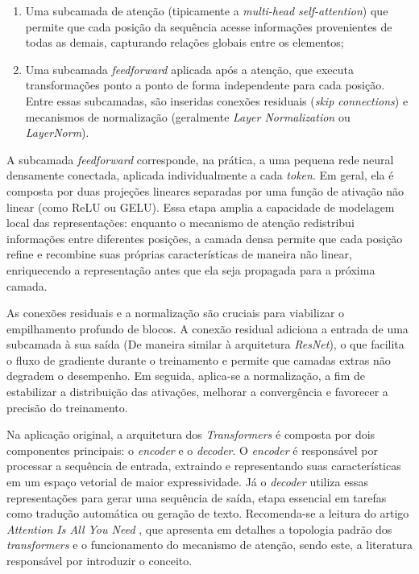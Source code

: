 \begin{enumerate}
    \item Uma subcamada de atenção (tipicamente a \textit{multi-head self-attention}) que permite que cada posição da sequência acesse informações provenientes de todas as demais, capturando relações globais entre os elementos;
    \item Uma subcamada \textit{feedforward} aplicada após a atenção, que executa transformações ponto a ponto de forma independente para cada posição. Entre essas subcamadas, são inseridas conexões residuais (\textit{skip connections}) e mecanismos de normalização (geralmente\textit{ Layer Normalization} ou \textit{LayerNorm}).
\end{enumerate}

A subcamada \textit{feedforward} corresponde, na prática, a uma pequena rede neural densamente conectada, aplicada individualmente a cada \textit{token}. Em geral, ela é composta por duas projeções lineares separadas por uma função de ativação não linear (como \acs{ReLU} ou \acs{GELU}). Essa etapa amplia a capacidade de modelagem local das representações: enquanto o mecanismo de atenção redistribui informações entre diferentes posições, a camada densa permite que cada posição refine e recombine suas próprias características de maneira não linear, enriquecendo a representação antes que ela seja propagada para a próxima camada.

As conexões residuais e a normalização são cruciais para viabilizar o empilhamento profundo de blocos. A conexão residual adiciona a entrada de uma subcamada à sua saída (De maneira similar à arquitetura \textit{ResNet}), o que facilita o fluxo de gradiente durante o treinamento e permite que camadas extras não degradem o desempenho. Em seguida, aplica-se a normalização, a fim de estabilizar a distribuição das ativações, melhorar a convergência e favorecer a precisão do treinamento.

Na aplicação original, a arquitetura dos \textit{Transformers} é composta por dois componentes principais: o \textit{encoder} e o \textit{decoder}. O \textit{encoder} é responsável por processar a sequência de entrada, extraindo e representando suas características em um espaço vetorial de maior expressividade. Já o \textit{decoder} utiliza essas representações para gerar uma sequência de saída, etapa essencial em tarefas como tradução automática ou geração de texto. Recomenda-se a leitura do artigo \textit{Attention Is All You Need} \cite{vaswani2017}, que apresenta em detalhes a topologia padrão dos \textit{transformers} e o funcionamento do mecanismo de atenção, sendo este, a literatura responsável por introduzir o conceito.

